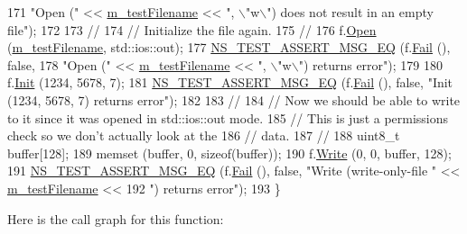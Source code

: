 \begin{DoxyCode}
171                          \textcolor{stringliteral}{"Open ("} << \hyperlink{classWriteModeCreateTestCase_a2dcb2ef5d9a2f9597f0cf646dcd600b8}{m\_testFilename} << \textcolor{stringliteral}{", \(\backslash\)"w\(\backslash\)") does not result in an empty
       file"});
172 
173   \textcolor{comment}{//}
174   \textcolor{comment}{// Initialize the file again.}
175   \textcolor{comment}{//}
176   f.\hyperlink{classns3_1_1PcapFile_a064e8494e28e823d0bb4e40549f9f483}{Open} (\hyperlink{classWriteModeCreateTestCase_a2dcb2ef5d9a2f9597f0cf646dcd600b8}{m\_testFilename}, std::ios::out);
177   \hyperlink{group__testing_ga2a9d78cffb3db8e867c35fff0b698cf5}{NS\_TEST\_ASSERT\_MSG\_EQ} (f.\hyperlink{classns3_1_1PcapFile_a2e00aa080890a0c9c3e9f5bd2d6c21d5}{Fail} (), \textcolor{keyword}{false}, 
178                          \textcolor{stringliteral}{"Open ("} << \hyperlink{classWriteModeCreateTestCase_a2dcb2ef5d9a2f9597f0cf646dcd600b8}{m\_testFilename} << \textcolor{stringliteral}{", \(\backslash\)"w\(\backslash\)") returns error"});
179 
180   f.\hyperlink{classns3_1_1PcapFile_a80c8adea1baa66e3f730df2927b0fc9b}{Init} (1234, 5678, 7);
181   \hyperlink{group__testing_ga2a9d78cffb3db8e867c35fff0b698cf5}{NS\_TEST\_ASSERT\_MSG\_EQ} (f.\hyperlink{classns3_1_1PcapFile_a2e00aa080890a0c9c3e9f5bd2d6c21d5}{Fail} (), \textcolor{keyword}{false}, \textcolor{stringliteral}{"Init (1234, 5678, 7) returns error"});
182 
183   \textcolor{comment}{//}
184   \textcolor{comment}{// Now we should be able to write to it since it was opened in std::ios::out mode.}
185   \textcolor{comment}{// This is just a permissions check so we don't actually look at the }
186   \textcolor{comment}{// data.}
187   \textcolor{comment}{//}
188   uint8\_t buffer[128];
189   memset (buffer, 0, \textcolor{keyword}{sizeof}(buffer));
190   f.\hyperlink{classns3_1_1PcapFile_a3920f5bae95ca0021875e6e9c2630ccf}{Write} (0, 0, buffer, 128);
191   \hyperlink{group__testing_ga2a9d78cffb3db8e867c35fff0b698cf5}{NS\_TEST\_ASSERT\_MSG\_EQ} (f.\hyperlink{classns3_1_1PcapFile_a2e00aa080890a0c9c3e9f5bd2d6c21d5}{Fail} (), \textcolor{keyword}{false}, \textcolor{stringliteral}{"Write (write-only-file "} << 
      \hyperlink{classWriteModeCreateTestCase_a2dcb2ef5d9a2f9597f0cf646dcd600b8}{m\_testFilename} << 
192                          \textcolor{stringliteral}{") returns error"});
193 \}
\end{DoxyCode}


Here is the call graph for this function\+:


